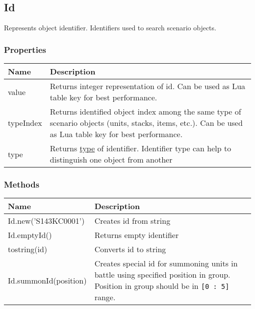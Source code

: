 \subsection{Id}
\label{Id}
Represents object identifier. Identifiers used to search scenario objects.
\subsubsection{Properties}
\begin{center}
\begin{tabularx}{\linewidth}{| l | X |}
\hline
\textbf{Name} & \textbf{Description} \\
\hline
value & Returns integer representation of id. Can be used as Lua table key for best performance.\\
\hline
typeIndex & Returns identified object index among the same type of scenario objects (units, stacks, items, etc.). Can be used as Lua table key for best performance.\\
\hline
type & Returns \hyperref[IdType]{type} of identifier. Identifier type can help to distinguish one object from another\\
\hline
\end{tabularx}
\end{center}
\subsubsection{Methods}
\begin{center}
\begin{tabularx}{\linewidth}{| l | X |}
\hline
\textbf{Name} & \textbf{Description} \\
\hline
Id.new('S143KC0001') & Creates id from string\\
\hline
Id.emptyId() & Returns empty identifier\\
\hline
tostring(id) & Converts id to string\\
\hline
Id.summonId(position) & Creates special id for summoning units in battle using specified position in group. Position in group should be in \texttt{[0 : 5]} range.\\
\hline
\end{tabularx}
\end{center}
